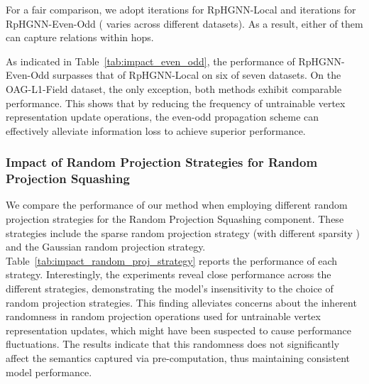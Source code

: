 \documentclass[lettersize,journal]{IEEEtran}
\begin{document}
For a fair comparison, we adopt  iterations for RpHGNN-Local and  iterations for RpHGNN-Even-Odd ( varies across different datasets).
As a result, either of them can capture relations within  hops.



As indicated in Table~\ref{tab:impact_even_odd}, the performance of RpHGNN-Even-Odd surpasses that of RpHGNN-Local on six of seven datasets.
On the OAG-L1-Field dataset, the only exception, both methods exhibit comparable performance. 
This shows that by reducing the frequency of untrainable vertex representation update operations, the even-odd propagation scheme can effectively alleviate information loss to achieve superior performance.






\subsubsection{Impact of Random Projection Strategies for Random Projection Squashing}\label{sec:impact_rand_proj}

We compare the performance of our method when employing different random projection strategies for the Random Projection Squashing component.
These strategies include the sparse random projection strategy (with different sparsity ) and the Gaussian random projection strategy.
Table~\ref{tab:impact_random_proj_strategy} reports the performance of each strategy.
Interestingly, the experiments reveal close performance across the different strategies, demonstrating the model’s insensitivity to the choice of random projection strategies.
This finding alleviates concerns about the inherent randomness in random projection operations used for untrainable vertex representation updates, which might have been suspected to cause performance fluctuations. 
The results indicate that this randomness does not significantly affect the semantics captured via pre-computation, thus maintaining consistent model performance.
\end{document}
